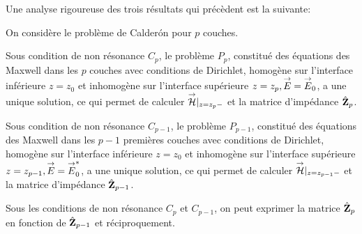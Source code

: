     Une analyse rigoureuse des trois résultats qui précèdent est la suivante:
    \begin{prop}
      On considère le problème de Calderón pour \(p\) couches.

      Sous condition de non résonance \(C_p\), le problème \(P_p\), constitué des équations des Maxwell dans les \(p\) couches avec conditions de Dirichlet, homogène sur l'interface inférieure \(z=z_0\) et inhomogène sur l'interface supérieure \(z=z_p, {\overset{\rightarrow}{E}}={\overset{\rightarrow}{E}}_0\), a une unique solution, ce qui permet de calculer \({\overset{\rightarrow}{\mathcal{H}}}\vert_{z=z_p-}\) et la matrice d'impédance $\hat{\mathbf{Z}}_{p}$.

      Sous condition de non résonance \(C_{p-1}\), le problème \(P_{p-1}\), constitué des équations des Maxwell dans les \(p-1\) premières couches avec conditions de Dirichlet, homogène sur l'interface inférieure \(z=z_0\) et inhomogène sur l'interface supérieure \(z=z_{p-1}, {\overset{\rightarrow}{E}}={\overset{\rightarrow}{E}}_0^*\), a une unique solution, ce qui permet de calculer \({\overset{\rightarrow}{\mathcal{H}}}\vert_{z=z_{p-1}-}\) et la matrice d'impédance \(\hat{\mathbf{Z}}_{p-1}\).

      Sous les conditions de non résonance \(C_p\) et \(C_{p-1}\), on peut exprimer la matrice \(\hat{\mathbf{Z}}_p\) en fonction de \(\hat{\mathbf{Z}}_{p-1}\) et réciproquement.
    \end{prop}


